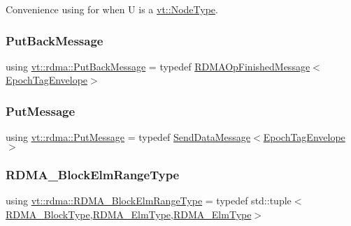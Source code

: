 Convenience using for when U is a \hyperlink{namespacevt_a866da9d0efc19c0a1ce79e9e492f47e2}{vt\+::\+Node\+Type}. 

\mbox{\label{namespacevt_1_1rdma_a07a52401fe8185d190371b3333dc61ac}} 
\subsubsection{\texorpdfstring{Put\+Back\+Message}{PutBackMessage}}
{\footnotesize\ttfamily using \hyperlink{namespacevt_1_1rdma_a07a52401fe8185d190371b3333dc61ac}{vt\+::rdma\+::\+Put\+Back\+Message} = typedef \hyperlink{structvt_1_1rdma_1_1_r_d_m_a_op_finished_message}{R\+D\+M\+A\+Op\+Finished\+Message}$<$\hyperlink{namespacevt_af23b58014ced6898422213a0e5e6a27a}{Epoch\+Tag\+Envelope}$>$}

\mbox{\label{namespacevt_1_1rdma_ae0a0330c647ec5ac5d508750f4cd4a06}} 
\subsubsection{\texorpdfstring{Put\+Message}{PutMessage}}
{\footnotesize\ttfamily using \hyperlink{namespacevt_1_1rdma_ae0a0330c647ec5ac5d508750f4cd4a06}{vt\+::rdma\+::\+Put\+Message} = typedef \hyperlink{structvt_1_1rdma_1_1_send_data_message}{Send\+Data\+Message}$<$\hyperlink{namespacevt_af23b58014ced6898422213a0e5e6a27a}{Epoch\+Tag\+Envelope}$>$}

\mbox{\label{namespacevt_1_1rdma_a8320f97b4a2866df60d9778486dbcd0f}} 
\subsubsection{\texorpdfstring{R\+D\+M\+A\+\_\+\+Block\+Elm\+Range\+Type}{RDMA\_BlockElmRangeType}}
{\footnotesize\ttfamily using \hyperlink{namespacevt_1_1rdma_a8320f97b4a2866df60d9778486dbcd0f}{vt\+::rdma\+::\+R\+D\+M\+A\+\_\+\+Block\+Elm\+Range\+Type} = typedef std\+::tuple$<$\hyperlink{namespacevt_ae54d2ca8f6bb4d65faf65118c82cd6f7}{R\+D\+M\+A\+\_\+\+Block\+Type},\hyperlink{namespacevt_a2c2a902092b72056f70210c159f966f0}{R\+D\+M\+A\+\_\+\+Elm\+Type},\hyperlink{namespacevt_a2c2a902092b72056f70210c159f966f0}{R\+D\+M\+A\+\_\+\+Elm\+Type}$>$}

